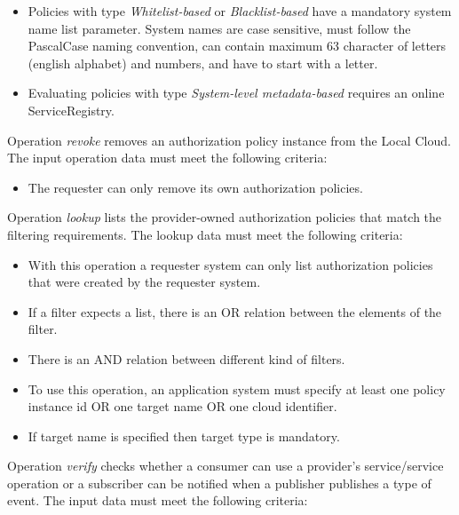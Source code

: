 \documentclass[a4paper]{arrowhead}
\begin{document}
\begin{itemize}
\begin{itemize}
        \end{itemize}
    \item Policies with type \textit{Whitelist-based} or \textit{Blacklist-based} have a mandatory system name list parameter. System names are case sensitive, must follow the PascalCase naming convention, can contain maximum 63 character of letters (english alphabet) and numbers, and have to start with a letter.
    \item Evaluating policies with type \textit{System-level metadata-based} requires an online ServiceRegistry.
\end{itemize}


Operation \textit{revoke} removes an authorization policy instance from the Local Cloud. The input operation data must meet the following criteria:

\begin{itemize}
    \item The requester can only remove its own authorization policies.
\end{itemize}


Operation \textit{lookup} lists the provider-owned authorization policies that match the filtering requirements. The lookup data must meet the following criteria:

\begin{itemize}
    \item With this operation a requester system can only list authorization policies that were created by the requester system.
    \item If a filter expects a list, there is an OR relation between the elements of the filter.
    \item There is an AND relation between different kind of filters.
    \item To use this operation, an application system must specify at least one policy instance id OR one target name OR one cloud identifier.
    \item If target name is specified then target type is mandatory.
\end{itemize}


Operation \textit{verify} checks whether a consumer can use a provider's service/service operation or a subscriber can be notified when a publisher publishes a type of event. The input data must meet the following criteria:
\end{document}
